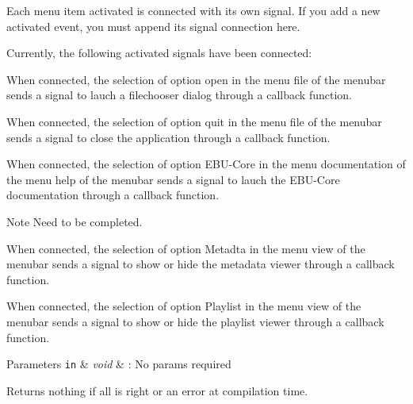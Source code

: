 Each menu item activated is connected with its own signal. If you add a new activated event, you must append its signal connection here.\par
 \par
 Currently, the following activated signals have been connected\-:\par
 \begin{DoxyItemize}
\item { When} connected, the selection of option open in the menu file of the menubar sends a signal to lauch a filechooser dialog through a callback function. \item { When} connected, the selection of option quit in the menu file of the menubar sends a signal to close the application through a callback function. \item { When} connected, the selection of option E\-B\-U-\/\-Core in the menu documentation of the menu help of the menubar sends a signal to lauch the E\-B\-U-\/\-Core documentation through a callback function. \begin{DoxyNote}{Note}
Need to be completed. 
\end{DoxyNote}
\item { When} connected, the selection of option Metadta in the menu view of the menubar sends a signal to show or hide the metadata viewer through a callback function. \item { When} connected, the selection of option Playlist in the menu view of the menubar sends a signal to show or hide the playlist viewer through a callback function. \par
 \par
 
\begin{DoxyParams}[1]{Parameters}
\mbox{\tt in}  & {\em void} & \-: No params required \\
\hline
\end{DoxyParams}
\begin{DoxyReturn}{Returns}
nothing if all is right or an error at compilation time. 
\end{DoxyReturn}
\end{DoxyItemize}


